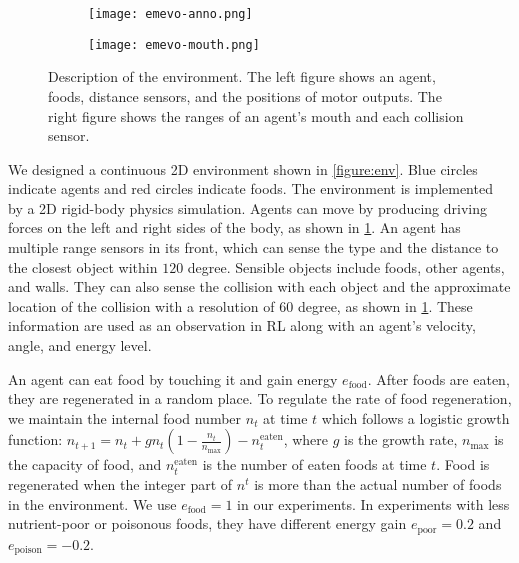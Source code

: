 \begin{figure}[t]
  \begin{subfigure}[t]{4cm}
    \centering
    \texttt{[image: emevo-anno.png]}
  \end{subfigure}
  \begin{subfigure}[t]{4cm}
    \centering
    \texttt{[image: emevo-mouth.png]}
  \end{subfigure}
  \caption{
    Description of the environment.
    The left figure shows an agent, foods, distance sensors, and the positions of motor outputs.
    The right figure shows the ranges of an agent's mouth and each collision sensor.
  }\label{figure:env-discr}
\end{figure}

We designed a continuous 2D environment shown in \cref{figure:env}. Blue circles indicate agents and red circles indicate foods. The environment is implemented by a 2D rigid-body physics simulation. Agents can move by producing driving forces on the left and right sides of the body, as shown in \cref{figure:env-discr}. An agent has multiple range sensors in its front, which can sense the type and the distance to the closest object within $120$ degree. Sensible objects include foods, other agents, and walls. They can also sense the collision with each object and the approximate location of the collision with a resolution of $60$ degree, as shown in \cref{figure:env-discr}. These information are used as an observation in RL along with an agent's velocity, angle, and energy level.

An agent can eat food by touching it and gain energy $e_{\mathrm{food}}$. After foods are eaten, they are regenerated in a random place. To regulate the rate of food regeneration, we maintain the internal food number $n_{t}$ at time $t$ which follows a logistic growth function: $n_{t + 1} = n_{t} + gn_{t}(1 - \frac{n_{t}}{n_{\mathrm{max}}}) - n_{t}^{\mathrm{eaten}}$, where $g$ is the growth rate, $n_{\mathrm{max}}$ is the capacity of food, and $n_{t}^{\mathrm{eaten}}$ is the number of eaten foods at time $t$. Food is regenerated when the integer part of $n^{t}$ is more than the actual number of foods in the environment. We use $e_{\mathrm{food}} = 1$ in our experiments. In experiments with less nutrient-poor or poisonous foods, they have different energy gain $e_{\mathrm{poor}} = 0.2$ and $e_{\mathrm{poison}} = -0.2$.

